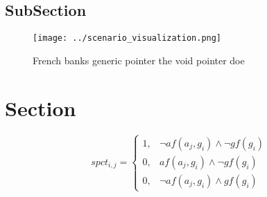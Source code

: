 \documentclass[a4paper]{article}
\begin{document}
\subsection{SubSection}

\begin{figure}
\centering
\texttt{[image: ../scenario\_visualization.png]}
\caption{French banks generic pointer the void pointer doe
}
\end{figure}
 
\section{Section}

\begin{equation}
spct_{i,j} =
\begin{cases}
1, & \text{$\neg af(a_j,g_i) \wedge \neg gf(g_i)$}\\
0, & \text{$af(a_j,g_i) \wedge \neg gf(g_i)$}\\
0, & \text{$\neg af(a_j,g_i) \wedge gf(g_i)$}
\end{cases}
\end{equation}
\end{document}
